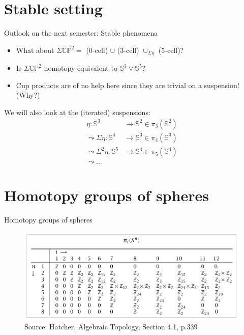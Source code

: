 \documentclass{beamer}
\newcommand{\sphere}[1]{\mathbb{S}^{#1}}
\newcommand{\CP}[1]{\mathbb{CP}^{#1}}
\begin{document}
\section{Stable setting}

\begin{frame}{Outlook on the next semester: Stable phenomena}

	\begin{itemize}
		\item What about $\Sigma \CP{2} = $ ($0$-cell) $\cup$ ($3$-cell) $\cup_{\Sigma \eta}$ ($5$-cell)?
		\pause
		\item Is $\Sigma \CP{2}$ homotopy equivalent to $\sphere{3} \vee \sphere{5}$?
		\pause
		\item Cup products are of no help here since they are trivial
		on a suspension! (Why?)
	\end{itemize}
	
	\pause
	\vfill
	
	\begin{block}{We will also look at the (iterated) suspensions:}
		\begin{align*}
			\eta \colon \sphere{3} & \rightarrow \sphere{2} \in \pi_3(\sphere{2}) \\
			\leadsto \Sigma \eta \colon \sphere{4} & \rightarrow \sphere{3} \in \pi_4(\sphere{3}) \\
			\leadsto \Sigma^{2} \eta \colon \sphere{5} & \rightarrow \sphere{4} \in \pi_5(\sphere{4}) \\
			\leadsto \ldots
		\end{align*}
	\end{block}

\end{frame}

\section{Homotopy groups of spheres}

\begin{frame}{Homotopy groups of spheres}

	\begin{figure}
		\includegraphics[width=\textwidth]{pictures/spheres_homotopy_groups.png}
		\caption{
			\label{fig:spheres_homotopy_groups}
			Source: Hatcher, Algebraic Topology, Section 4.1, p.339}
	\end{figure}

\end{frame}
\end{document}
